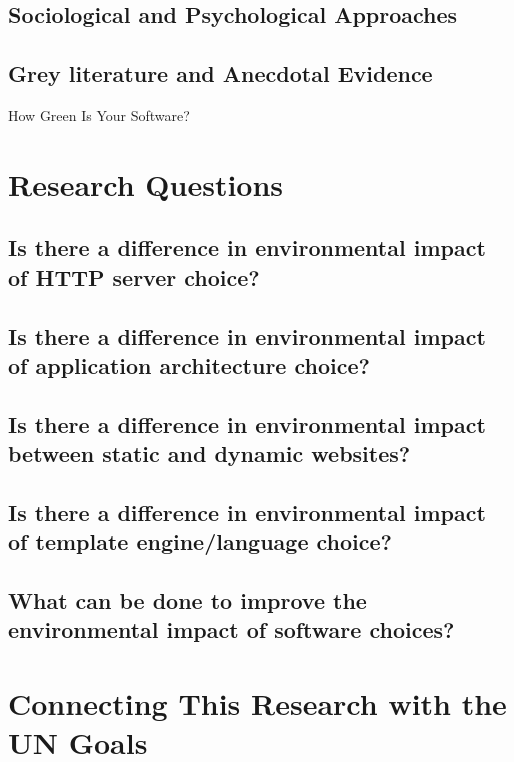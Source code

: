 \subsection{Sociological and Psychological Approaches}

\subsection{Grey literature and Anecdotal Evidence}

\citep{Podder2020} How Green Is Your Software?

\section{Research Questions}
\label{section:research questions}


\subsection{Is there a difference in environmental impact of HTTP server choice?}


\subsection{Is there a difference in environmental impact of application architecture choice?}


\subsection{Is there a difference in environmental impact between static and dynamic websites?}


\subsection{Is there a difference in environmental impact of template engine/language choice?}


\subsection{What can be done to improve the environmental impact of software choices?}

\section{Connecting This Research with the UN Goals}
\label{section:connecting with UN goals}


